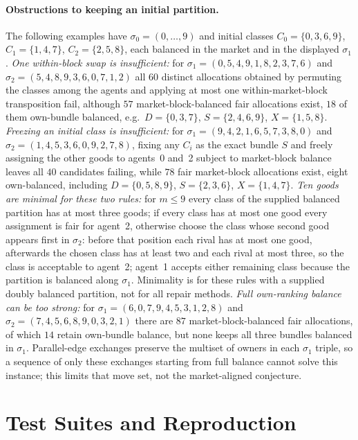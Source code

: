 \documentclass[11pt]{article}
\theoremstyle{definition}
\begin{document}
\paragraph{Obstructions to keeping an initial partition.}
The following examples have $\sigma_0=(0,\dots,9)$ and initial classes $C_0=\{0,3,6,9\}$, $C_1=\{1,4,7\}$, $C_2=\{2,5,8\}$, each balanced in the market and in the displayed $\sigma_1$.
\emph{One within-block swap is insufficient:} for $\sigma_1=(0,5,4,9,1,8,2,3,7,6)$ and $\sigma_2=(5,4,8,9,3,6,0,7,1,2)$ all $60$ distinct allocations obtained by permuting the classes among the agents and applying at most one within-market-block transposition fail, although $57$ market-block-balanced fair allocations exist, $18$ of them own-bundle balanced, e.g.\ $D=\{0,3,7\}$, $S=\{2,4,6,9\}$, $X=\{1,5,8\}$.
\emph{Freezing an initial class is insufficient:} for $\sigma_1=(9,4,2,1,6,5,7,3,8,0)$ and $\sigma_2=(1,4,5,3,6,0,9,2,7,8)$, fixing any $C_i$ as the exact bundle $S$ and freely assigning the other goods to agents~0 and~2 subject to market-block balance leaves all $40$ candidates failing, while $78$ fair market-block allocations exist, eight own-balanced, including $D=\{0,5,8,9\}$, $S=\{2,3,6\}$, $X=\{1,4,7\}$.
\emph{Ten goods are minimal for these two rules:} for $m\le9$ every class of the supplied balanced partition has at most three goods; if every class has at most one good every assignment is fair for agent~2, otherwise choose the class whose second good appears first in $\sigma_2$: before that position each rival has at most one good, afterwards the chosen class has at least two and each rival at most three, so the class is acceptable to agent~2; agent~1 accepts either remaining class because the partition is balanced along $\sigma_1$. Minimality is for these rules with a supplied doubly balanced partition, not for all repair methods.
\emph{Full own-ranking balance can be too strong:} for $\sigma_1=(6,0,7,9,4,5,3,1,2,8)$ and $\sigma_2=(7,4,5,6,8,9,0,3,2,1)$ there are $87$ market-block-balanced fair allocations, of which $14$ retain own-bundle balance, but none keeps all three bundles balanced in $\sigma_1$. Parallel-edge exchanges preserve the multiset of owners in each $\sigma_1$ triple, so a sequence of only these exchanges starting from full balance cannot solve this instance; this limits that move set, not the market-aligned conjecture.

\section{Test Suites and Reproduction}\label{app:tests}
\end{document}
